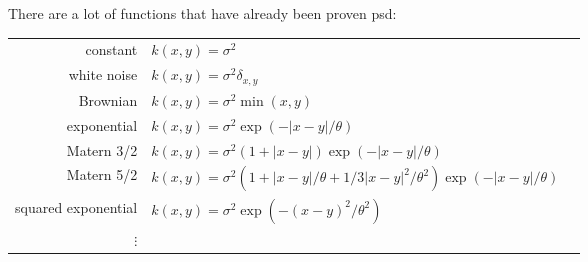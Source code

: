 \begin{frame}{}
There are a lot of functions that have already been proven psd:\\
\vspace{2mm}
\footnotesize
\begin{tabular}{rlN}
		constant & $ \displaystyle k(x,y) = \sigma^2 $ &\\[4mm]
		white noise & $ \displaystyle k(x,y) = \sigma^2 \delta_{x,y} $ &\\[4mm]
		Brownian & $ \displaystyle k(x,y) =  \sigma^2  \min (x,y) $ &\\[4mm]
		exponential & $\displaystyle k(x,y) =  \sigma^2 \exp \left(- |x-y|/\theta \right)$ &\\[4mm]
		Matern 3/2 & $\displaystyle k(x,y) =  \sigma^2 \left(1 + |x-y| \right) \exp \left(- |x-y| /\theta\right)$ &\\[4mm]
		Matern 5/2 & $\displaystyle k(x,y) =  \sigma^2 \left(1 + |x-y| /\theta+ 1/3|x-y|^2 /\theta^2 \right) \exp \left(- |x-y| /\theta\right)$ &\\[4mm]
		\hspace{-5mm}squared exponential & $\displaystyle k(x,y) =  \sigma^2 \exp \left(- (x-y)^2 /\theta^2 \right)$ &\\[4mm]
		$\vdots$ &
\end{tabular}\\

\end{frame}
